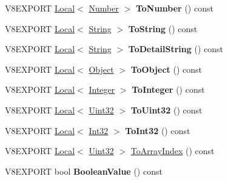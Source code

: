 \begin{DoxyCompactItemize}
\item 
\hypertarget{classv8_1_1_value_a8c1789ff6f8986d0ab2dfb807b20f6c5}{}V8\+E\+X\+P\+O\+R\+T \hyperlink{classv8_1_1_local}{Local}$<$ \hyperlink{classv8_1_1_number}{Number} $>$ {\bfseries To\+Number} () const \label{classv8_1_1_value_a8c1789ff6f8986d0ab2dfb807b20f6c5}

\item 
\hypertarget{classv8_1_1_value_a170ac861b877d846c4a5d4365d493dd9}{}V8\+E\+X\+P\+O\+R\+T \hyperlink{classv8_1_1_local}{Local}$<$ \hyperlink{classv8_1_1_string}{String} $>$ {\bfseries To\+String} () const \label{classv8_1_1_value_a170ac861b877d846c4a5d4365d493dd9}

\item 
\hypertarget{classv8_1_1_value_a5f1c2fff87d9b9b7f27a690f037df13a}{}V8\+E\+X\+P\+O\+R\+T \hyperlink{classv8_1_1_local}{Local}$<$ \hyperlink{classv8_1_1_string}{String} $>$ {\bfseries To\+Detail\+String} () const \label{classv8_1_1_value_a5f1c2fff87d9b9b7f27a690f037df13a}

\item 
\hypertarget{classv8_1_1_value_a5b604dcae6581adb11de6f4fad43d1db}{}V8\+E\+X\+P\+O\+R\+T \hyperlink{classv8_1_1_local}{Local}$<$ \hyperlink{classv8_1_1_object}{Object} $>$ {\bfseries To\+Object} () const \label{classv8_1_1_value_a5b604dcae6581adb11de6f4fad43d1db}

\item 
\hypertarget{classv8_1_1_value_a361a09e3647fc2c8048cc721f4b80b2d}{}V8\+E\+X\+P\+O\+R\+T \hyperlink{classv8_1_1_local}{Local}$<$ \hyperlink{classv8_1_1_integer}{Integer} $>$ {\bfseries To\+Integer} () const \label{classv8_1_1_value_a361a09e3647fc2c8048cc721f4b80b2d}

\item 
\hypertarget{classv8_1_1_value_acaaf19acb4ff3f64f9ec39b95b3894ca}{}V8\+E\+X\+P\+O\+R\+T \hyperlink{classv8_1_1_local}{Local}$<$ \hyperlink{classv8_1_1_uint32}{Uint32} $>$ {\bfseries To\+Uint32} () const \label{classv8_1_1_value_acaaf19acb4ff3f64f9ec39b95b3894ca}

\item 
\hypertarget{classv8_1_1_value_aff185348c35e787a2994d81bafcea922}{}V8\+E\+X\+P\+O\+R\+T \hyperlink{classv8_1_1_local}{Local}$<$ \hyperlink{classv8_1_1_int32}{Int32} $>$ {\bfseries To\+Int32} () const \label{classv8_1_1_value_aff185348c35e787a2994d81bafcea922}

\item 
V8\+E\+X\+P\+O\+R\+T \hyperlink{classv8_1_1_local}{Local}$<$ \hyperlink{classv8_1_1_uint32}{Uint32} $>$ \hyperlink{classv8_1_1_value_ab6b19a1e5aa5df50dfbb5d2ffa60bcdc}{To\+Array\+Index} () const 
\item 
\hypertarget{classv8_1_1_value_a800fa027ad660d8ba9282acaaf10b03d}{}V8\+E\+X\+P\+O\+R\+T bool {\bfseries Boolean\+Value} () const \label{classv8_1_1_value_a800fa027ad660d8ba9282acaaf10b03d}


\end{DoxyCompactItemize}
